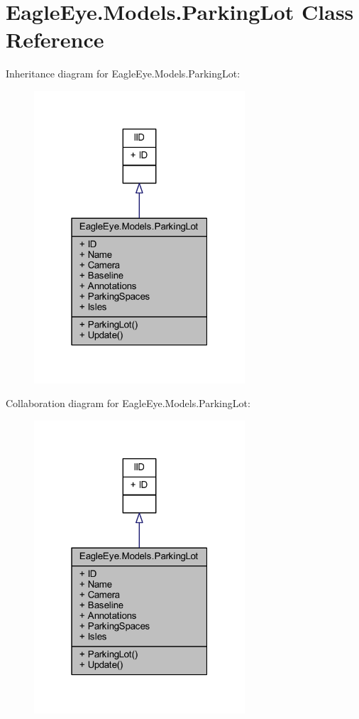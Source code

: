 \hypertarget{class_eagle_eye_1_1_models_1_1_parking_lot}{}\section{Eagle\+Eye.\+Models.\+Parking\+Lot Class Reference}
\label{class_eagle_eye_1_1_models_1_1_parking_lot}


Inheritance diagram for Eagle\+Eye.\+Models.\+Parking\+Lot\+:\nopagebreak
\begin{figure}[H]
\begin{center}
\leavevmode
\includegraphics[width=223pt]{class_eagle_eye_1_1_models_1_1_parking_lot__inherit__graph}
\end{center}
\end{figure}


Collaboration diagram for Eagle\+Eye.\+Models.\+Parking\+Lot\+:\nopagebreak
\begin{figure}[H]
\begin{center}
\leavevmode
\includegraphics[width=223pt]{class_eagle_eye_1_1_models_1_1_parking_lot__coll__graph}
\end{center}
\end{figure}
